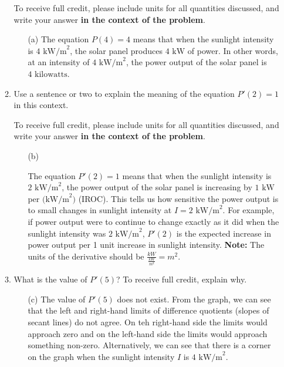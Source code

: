 \documentclass[11pt]{article}
\begin{document}
\begin{enumerate}
\begin{enumerate}
    To receive full credit, please include units for all quantities discussed, and write your answer \textbf{in the context of the problem}.

\begin{enumerate}
\item[(a)]
{\color{blue}
The equation $P(4)=4$ means that when the sunlight intensity is 
$4\text{ kW/m}^2$, the solar panel produces $4\text{ kW}$ of power. 
In other words, at an intensity of $4\text{ kW/m}^2$, the power output of the solar panel is $4\text{ kilowatts}$.
}
\end{enumerate}
    \item Use a sentence or two to explain the meaning of the equation $P'(2)=1$ in this context. 

    To receive full credit, please include units for all quantities discussed, and write your answer \textbf{in the context of the problem}.
\begin{enumerate}
\item[(b)] 
{\color{blue}
The equation $P'(2)=1$ means that when the sunlight intensity is 
$2\text{ kW/m}^2$, the power output of the solar panel is increasing by
$1\text{ kW}$ per $\text{(kW/m}^2)$ (IROC). 
This tells us how sensitive the power output is to small changes in sunlight intensity at $I=2\text{ kW/m}^2$. For example, if  power output were to continue to change exactly as it did when the sunlight intensity was $2\text{ kW/m}^2$, $P'(2)$ is the expected increase in power output per 1 unit increase in sunlight intensity. \textbf{Note:} The units of the derivative should be $\frac{kW}{\frac{kW}{m^2}} = m^2.$ 



}

\end{enumerate}
    \item What is the value of $P'(5)$? To receive full credit, explain why.

    
\begin{enumerate}

\item[(c)] 
{\color{blue}
The value of $P'(5)$ does not exist. 
From the graph, we can see that the left and right-hand limits of difference quotients (slopes of secant lines) do not agree. On teh right-hand side the limits would approach zero and on the left-hand side the limits would approach something non-zero. Alternatively, we can see that there is a corner on the graph when the sunlight intensity $I$ is $4\text{ kW/m}^2$.
}
\end{enumerate}
\end{enumerate}





\end{enumerate}
\end{document}
